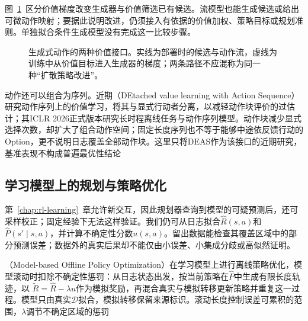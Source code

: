 图~\ref{fig:rl-information-extraction}~区分价值梯度改变生成器与价值筛选已有候选。流模型也能生成候选或给出可微动作映射；要据此说明改进，仍须接入有依据的价值加权、策略目标或规划准则。单独拟合条件生成模型没有完成这一比较步骤。

\begin{figure}[htbp]
  \centering
  
  \caption{生成式动作的两种价值接口。实线为部署时的候选与动作流，虚线为训练中从价值目标进入生成器的梯度；两条路径不应混称为同一种“扩散策略改进”。}
  \label{fig:rl-information-extraction}
\end{figure}

动作还可以组合为序列。近期（DEtached value learning with Action Sequence）研究动作序列上的价值学习，将其与显式行动者分离，以减轻动作块评价的过估计；其ICLR 2026正式版本研究长时程离线任务与动作序列模型。动作块减少显式选择次数，却扩大了组合动作空间；固定长度序列也不等于能够中途依反馈行动的Option，更不说明日志覆盖全部动作块。这里只将DEAS作为该接口的近期研究，基准表现不构成普遍最优性结论

\subsection{学习模型上的规划与策略优化}
\label{sec:rl-information-model-learning}

第~\ref{chap:rl-learning}~章允许新交互，因此规划器查询到模型的可疑预测后，还可采样校正；固定经验下无法这样验证。我们仍可从日志拟合$\widehat R(s,a)$和$\widehat P(s'\mid s,a)$，并计算不确定性分数$u(s,a)$。留出数据能检查其覆盖区域中的部分预测误差；数据外的真实后果却不能仅由小误差、小集成分歧或高似然证明。

（Model-based Offline Policy Optimization）在学习模型上进行离线策略优化，模型滚动时扣除不确定性惩罚：从日志状态出发，按当前策略在$\widehat P$中生成有限长度轨迹，以
$\widetilde R=\widehat R-\lambda u$作为模拟奖励，再混合真实与模拟转移更新策略并重复这一过程。模型只由真实$\mathcal D$拟合，模拟转移保留来源标识。滚动长度控制误差可累积的范围，$\lambda$调节不确定区域的惩罚

